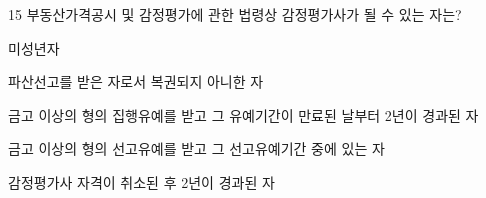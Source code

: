 \begin{question}{15}
부동산가격공시 및 감정평가에 관한 법령상 감정평가사가 될 수 있는 자는?
\begin{choices}
  \item 미성년자
  \item 파산선고를 받은 자로서 복권되지 아니한 자
  \item 금고 이상의 형의 집행유예를 받고 그 유예기간이 만료된 날부터 2년이 경과된 자
  \item 금고 이상의 형의 선고유예를 받고 그 선고유예기간 중에 있는 자
  \item 감정평가사 자격이 취소된 후 2년이 경과된 자
\end{choices}
\end{question}
